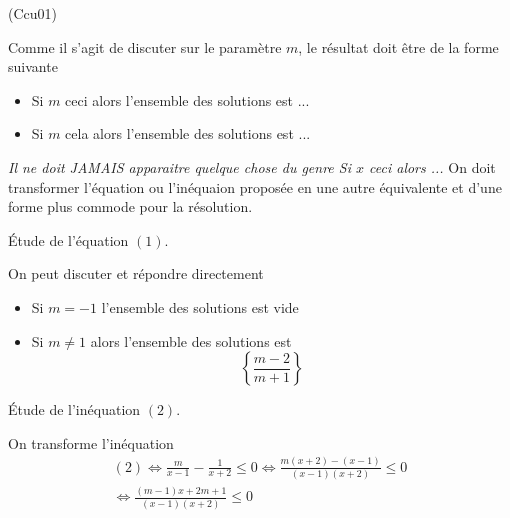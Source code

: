 \begin{tiny}(Ccu01)\end{tiny} Comme il s'agit de discuter sur le paramètre $m$, le résultat doit être de la forme suivante
\begin{itemize}
 \item Si $m$ ceci alors l'ensemble des solutions est ...
 \item Si $m$ cela alors l'ensemble des solutions est ...
\end{itemize}
\emph{Il ne doit JAMAIS apparaitre quelque chose du genre \og Si $x$ ceci alors ...\fg}\newline
On doit transformer l'équation ou l'inéquaion proposée en une autre équivalente et d'une forme plus commode pour la résolution.

\begin{center}
\'Etude de l'équation $(1)$.  
\end{center}
On peut discuter et répondre directement
\begin{itemize}
 \item Si $m = -1$ l'ensemble des solutions est vide
 \item Si $m \neq 1$  alors l'ensemble des solutions est
\begin{displaymath}
 \left\lbrace \frac{m-2}{m+1}\right\rbrace 
\end{displaymath}
\end{itemize}

\begin{center}
  \'Etude de l'inéquation $(2)$.
\end{center} 
On transforme l'inéquation 
\begin{multline*}
 (2)\Leftrightarrow
\frac{m}{x-1}-\frac{1}{x+2}\leq 0\Leftrightarrow
\frac{m(x+2)-(x-1)}{(x-1)(x+2)}\leq 0 \\
\Leftrightarrow
\frac{(m-1)x+2m+1}{(x-1)(x+2)}\leq 0
\end{multline*}

